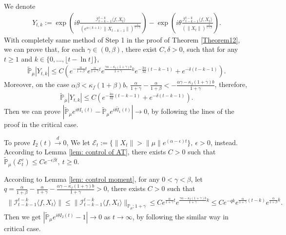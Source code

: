 \documentclass[12pt,oneside,english]{amsart}
\theoremstyle{plain}
\theoremstyle{definition}
\numberwithin{equation}{section}
\begin{document}
    We denote
    \begin{align*}
        Y_{t,k}:=\exp\left(i\theta\frac{\mathcal I_{t-k-1}^{t-k}\langle f ,X_t\rangle}{( e^{\alpha(k+1)}\|X_{t-k-1}\|)^{\frac{1}{1+\beta}}}\right)-\exp\left(i\theta\frac{\mathcal I_{t-k-1}^{t-k}\langle f ,X_t\rangle}{\left(\|X_t\|\right)^{\frac{1}{1+\beta}}}\right).
    \end{align*}
With completely same method of Step 1 in the proof of Theorem \ref{Theorem12}, we can prove that, for each $\gamma\in (0,\beta)$, there exist $C,\delta>0$, such that for any $t\geq1$ and $k\in \{0,...,\lfloor t-\ln t\rfloor\}$,
\begin{align*}
    \mathbb{\tilde{P}}_{\mu}|Y_{t,k}|\leq C( e^{-\frac{\alpha}{1+\beta}t}e^{\frac{\alpha}{1+\gamma}t}e^{\frac{\gamma \alpha-\kappa_f(1+\gamma)b}{1+\gamma}k}e^{-\frac{3\alpha}{32}(t-k-1)}+ e^{-\delta(t-k-1)}).
\end{align*}
Moreover, on the case $\alpha\beta<\kappa_f(1+\beta)b$,  $\frac{\alpha}{1+\gamma}-\frac{\alpha}{1+\beta}< - \frac{\alpha\gamma-\kappa_f(1+\gamma)b}{1+\gamma}$, therefore,
\begin{align}
    \mathbb{\tilde{P}}_{\mu}|Y_{t,k}|\leq C (e^{-\frac{3\alpha}{32}(t-k-1)}+e^{-\delta(t-k-1)}).
\end{align}
Then we can prove $\left|\mathbb{\tilde{P}}_{\mu}e^{i\theta I_1(t)}-\mathbb{\tilde{P}}_{\mu}e^{i\theta\tilde{I}_1(t)}\right|\rightarrow 0$, by following the lines of the proof in the critical case.

To prove $I_2(t)\xrightarrow{d} 0$, We let $\mathcal{E}_t:=\{\|X_t\|>\|\mu\|e^{(\alpha-\epsilon )t}\},~\epsilon>0$, instead. According to Lemma \ref{lem: control of AT}, there exists
$C>0$ such that  $\mathbb{\tilde{P}}_{\mu}(\mathcal{E}_t^c)\leq C e^{-\epsilon \beta t},~t\geq 0$.

According to Lemma \ref{lem: control moment}, for any $0< \gamma <\beta$, let $q=\frac{\alpha}{1+\beta}-\frac{\alpha}{1+\gamma} - \frac{\alpha\gamma-\kappa_f(1+\gamma)b}{1+\gamma}>0$, there exists $C>0$ such that
\begin{align}
    \|\mathcal I_{t-k-1}^{t-k}\langle f ,X_t\rangle\|\leq \|\mathcal I_{t-k-1}^{t-k}\langle f ,X_t\rangle\|_{\mathbb{P}_{\mu};1+\gamma}\leq C e^{\frac{\alpha}{1+\gamma}t}e^{\frac{\gamma \alpha-\kappa_f(1+\gamma)b}{1+\gamma}k}\leq C e^{-qk}e^{\frac{\alpha}{1+\gamma}(t-k)}e^{\frac{\alpha}{1+\beta}k}.
\end{align}
Then we get $  \left|\mathbb{\tilde{P}}_{\mu}e^{i\theta I_2(t)}-1\right|\rightarrow 0$ as $ t\rightarrow \infty$, by following the similar way in critical case.
\end{document}
